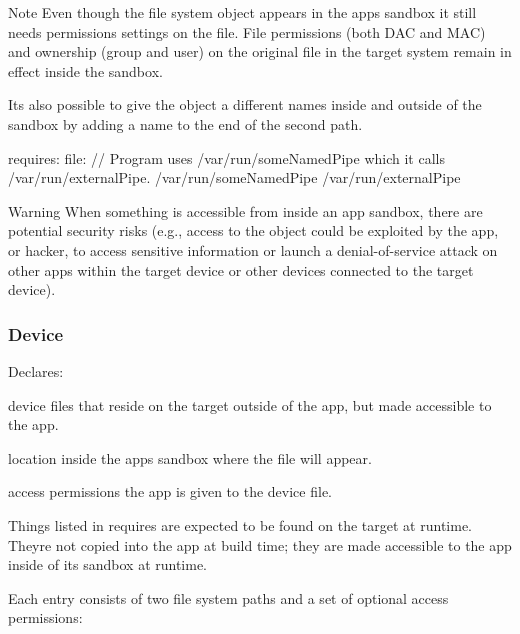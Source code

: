\begin{DoxyNote}{Note}
Even though the file system object appears in the app\textquotesingle{}s sandbox it still needs permissions settings on the file. File permissions (both D\+A\+C and M\+A\+C) and ownership (group and user) on the original file in the target system remain in effect inside the sandbox.
\end{DoxyNote}
It\textquotesingle{}s also possible to give the object a different names inside and outside of the sandbox by adding a name to the end of the second path.

\begin{DoxyVerb}requires:
{
    file:
    {
        // Program uses /var/run/someNamedPipe which it calls /var/run/externalPipe.
        /var/run/someNamedPipe  /var/run/externalPipe
    }
}
\end{DoxyVerb}


\begin{DoxyWarning}{Warning}
When something is accessible from inside an app sandbox, there are potential security risks (e.\+g., access to the object could be exploited by the app, or hacker, to access sensitive information or launch a denial-\/of-\/service attack on other apps within the target device or other devices connected to the target device).
\end{DoxyWarning}
\hypertarget{def_files_cdef_defFilesCdef_requiresDevice}{}\subsubsection{Device}\label{def_files_cdef_defFilesCdef_requiresDevice}
Declares\+:
\begin{DoxyItemize}
\item device files that reside on the target outside of the app, but made accessible to the app.
\item location inside the app\textquotesingle{}s sandbox where the file will appear.
\item access permissions the app is given to the device file.
\end{DoxyItemize}

Things listed in {\ttfamily requires} are expected to be found on the target at runtime. They\textquotesingle{}re not copied into the app at build time; they are made accessible to the app inside of its sandbox at runtime.

Each entry consists of two file system paths and a set of optional access permissions\+:


